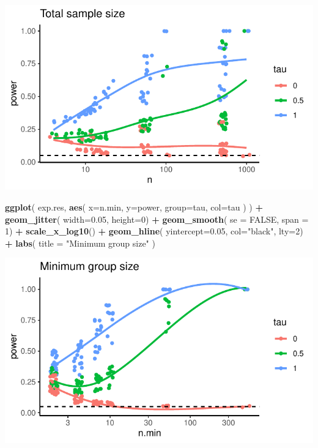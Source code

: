 \documentclass[
]{book}
\newenvironment{Shaded}{\begin{snugshade}}{\end{snugshade}}
\newcommand{\AttributeTok}[1]{\textcolor[rgb]{0.13,0.29,0.53}{#1}}
\newcommand{\ConstantTok}[1]{\textcolor[rgb]{0.56,0.35,0.01}{#1}}
\newcommand{\DecValTok}[1]{\textcolor[rgb]{0.00,0.00,0.81}{#1}}
\newcommand{\FloatTok}[1]{\textcolor[rgb]{0.00,0.00,0.81}{#1}}
\newcommand{\FunctionTok}[1]{\textcolor[rgb]{0.13,0.29,0.53}{\textbf{#1}}}
\newcommand{\NormalTok}[1]{#1}
\newcommand{\SpecialCharTok}[1]{\textcolor[rgb]{0.81,0.36,0.00}{\textbf{#1}}}
\newcommand{\StringTok}[1]{\textcolor[rgb]{0.31,0.60,0.02}{#1}}
\begin{document}
\begin{center}\includegraphics[width=0.75\linewidth]{Designing-Simulations-in-R_files/figure-latex/plotA-1} \end{center}

\begin{Shaded}
\begin{Highlighting}[]
\FunctionTok{ggplot}\NormalTok{( exp.res, }\FunctionTok{aes}\NormalTok{( }\AttributeTok{x=}\NormalTok{n.min, }\AttributeTok{y=}\NormalTok{power, }\AttributeTok{group=}\NormalTok{tau, }\AttributeTok{col=}\NormalTok{tau ) ) }\SpecialCharTok{+}
  \FunctionTok{geom\_jitter}\NormalTok{( }\AttributeTok{width=}\FloatTok{0.05}\NormalTok{, }\AttributeTok{height=}\DecValTok{0}\NormalTok{) }\SpecialCharTok{+}
  \FunctionTok{geom\_smooth}\NormalTok{( }\AttributeTok{se =} \ConstantTok{FALSE}\NormalTok{, }\AttributeTok{span =} \DecValTok{1}\NormalTok{) }\SpecialCharTok{+}
  \FunctionTok{scale\_x\_log10}\NormalTok{() }\SpecialCharTok{+}
  \FunctionTok{geom\_hline}\NormalTok{( }\AttributeTok{yintercept=}\FloatTok{0.05}\NormalTok{, }\AttributeTok{col=}\StringTok{"black"}\NormalTok{, }\AttributeTok{lty=}\DecValTok{2}\NormalTok{) }\SpecialCharTok{+}
  \FunctionTok{labs}\NormalTok{( }\AttributeTok{title =} \StringTok{"Minimum group size"}\NormalTok{ )}
\end{Highlighting}
\end{Shaded}

\begin{center}\includegraphics[width=0.75\linewidth]{Designing-Simulations-in-R_files/figure-latex/plotB-1} \end{center}
\end{document}
